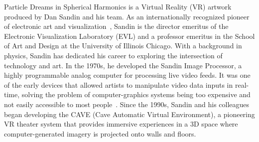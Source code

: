 Particle Dreams in Spherical Harmonics is a Virtual Reality (VR) artwork produced by Dan Sandin and his team. As an internationally recognized pioneer of electronic art and visualization~\cite{sandin}, Sandin is the director emeritus of the Electronic Visualization Laboratory (EVL) and a professor emeritus in the School of Art and Design at the University of Illinois Chicago. With a background in physics, Sandin has dedicated his career to exploring the intersection of technology and art.
In the 1970s, he developed the Sandin Image Processor, a highly programmable analog computer for processing live video feeds. It was one of the early devices that allowed artists to manipulate video data inputs in real-time, solving the problem of computer-graphics systems being too expensive and not easily accessible to most people~\cite{johnson2024electronic}.
Since the 1990s, Sandin and his colleagues began developing the CAVE (Cave Automatic Virtual Environment), a pioneering VR theater system that provides immersive experiences in a 3D space where computer-generated imagery is projected onto walls and floors.


